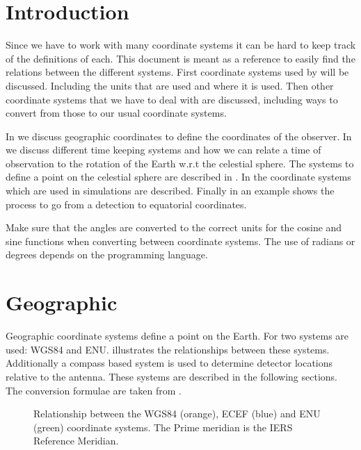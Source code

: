 \section{Introduction}

Since we have to work with many coordinate systems it can be hard to
keep track of the definitions of each. This document is meant as a
reference to easily find the relations between the different systems.
First coordinate systems used by \hisparc will be discussed. Including
the units that are used and where it is used. Then other coordinate
systems that we have to deal with are discussed, including ways to
convert from those to our usual coordinate systems.

In  we discuss geographic coordinates to define
the coordinates of the observer. In  we discuss
different time keeping systems and how we can relate a time of
observation to the rotation of the Earth w.r.t the celestial sphere. The
systems to define a point on the celestial sphere are described in
. In  the coordinate systems
which are used in \corsika simulations are described. Finally in
 an example shows the process to go from a \hisparc
detection to equatorial coordinates.

Make sure that the angles are converted to the correct units for the
cosine and sine functions when converting between coordinate systems.
The use of radians or degrees depends on the programming language.


\section{Geographic}
\label{sec:geographic}

Geographic coordinate systems define a point on the Earth. For \hisparc
two systems are used: WGS84 and ENU. 
illustrates the relationships between these systems. Additionally a
compass based system is used to determine detector locations relative to
the \gps antenna. These systems are described in the following sections.
The conversion formulae are taken from \cite{wikipedia:2014aa}.

\begin{figure}
    \centering
    
    \caption{Relationship between the WGS84 (orange), ECEF (blue) and ENU
             (green) coordinate systems. The Prime meridian is the IERS
             Reference Meridian.}
    \label{fig:wgs84_ecef_enu}
\end{figure}


